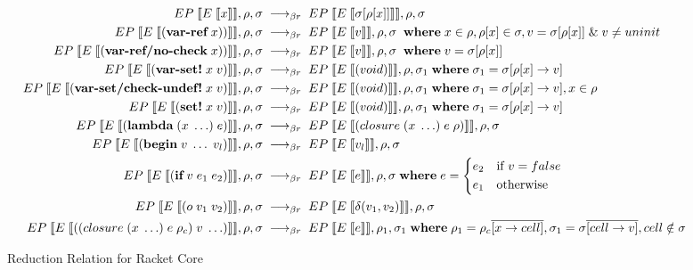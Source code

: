 \documentclass[sigplan,screen,anonymous]{acmart}
\def\dash {\text{-}}
\begin{document}
\begin{figure*}[tbp]
  \begin{align*}
    \rcinput{x} \rcrel \rcoutput{\sigma[\rho[x]]}{\rho}{\sigma} \\
    \rcinput{(\textbf{var\dash ref}\; x))} \rcrel \rcoutput{v}{\rho}{\sigma}\; \where x \in \rho, \rho[x] \in \sigma, v = \sigma[\rho[x]]\; \&\; v \neq uninit\\
    \rcinput{(\textbf{var\dash ref/no\dash check}\; x))} \rcrel \rcoutput{v}{\rho}{\sigma}\; \where v = \sigma[\rho[x]] \\
    \rcinput{(\textbf{var\dash set!}\; x\; v)} \rcrel \rcoutput{(void)}{\rho}{\sigma_1} \where \sigma_1 = \sigma[\rho[x]\rightarrow v]\\
    \rcinput{(\textbf{var\dash set/check\dash undef!}\; x\; v)} \rcrel \rcoutput{(void)}{\rho}{\sigma_1} \where \sigma_1 = \sigma[\rho[x]\rightarrow v], x \in \rho\\
    \rcinput{(\textbf{set!}\; x\; v)} \rcrel \rcoutput{(void)}{\rho}{\sigma_1} \where \sigma_1 = \sigma[\rho[x]\rightarrow v]\\
    \rcinput{(\textbf{lambda}\; (x\; \ldots)\; e)} \rcrel \rcoutput{(closure\; (x\; \ldots)\; e\; \rho)}{\rho}{\sigma} \\
    \rcinput{(\textbf{begin}\; v\; \ldots\; v_l)} \rcrel \rcoutput{v_l}{\rho}{\sigma} \\
    \rcinput{(\textbf{if}\; v\; e_1\; e_2)} \rcrel \rcoutput{e}{\rho}{\sigma} \where e = \begin{cases*}
      e_2 & if $v = false$ \\
      e_1 & otherwise
    \end{cases*}\\
    \rcinput{(o\; v_1\; v_2)} \rcrel \rcoutput{\delta(v_1,v_2)}{\rho}{\sigma} \\
    \rcinput{((closure\; (x\; \ldots)\; e\; \rho_c)\;v\;\ldots)} \rcrel \rcoutput{e}{\rho_1}{\sigma_1} \where \rho_1 = \rho_c\overline{[x\rightarrow cell]}, \sigma_1 = \sigma\overline{[cell\rightarrow v]}, cell \notin \sigma \\
  \end{align*}
  \caption{Reduction Relation for Racket Core}
  \label{fig:rc-reduction}
\end{figure*}
\end{document}
